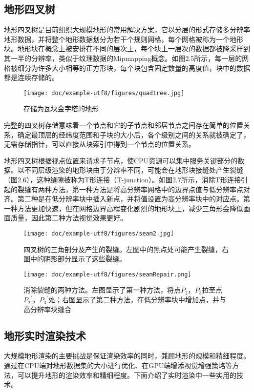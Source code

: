 \subsection{地形四叉树}
地形四叉树是目前组织大规模地形的常用解决方案，它以分层的形式存储多分辨率地形数据，并将整个地形数据划分为若干个规则网格，每个网格被称为一个地形块。地形块在概念上被安排在不同的层次上，每个块上一层次的数据都被降采样到其一半的分辨率，类似于纹理数据的Mipmapping概念。如图2.5所示，每一层的网格被细分为许多大小相等的正方形块，每个块包含固定数量的高度值，块中的数据都是连续存储的。\par
\begin{figure}[H]
    \centering
    \texttt{[image: doc/example-utf8/figures/quadtree.jpg]}
    \caption{存储为瓦块金字塔的地形\supercite{PlatingsCompression}}
\end{figure}
完整的四叉树存储意味着一个节点和它的子节点和邻居节点之间存在简单的位置关系，确定最顶层的经纬度范围和子块的大小后，各个级别之间的关系就被确定了，无需存储指针，可以直接从块索引中得到一个节点的位置关系。\par

地形四叉树根据视点位置来请求子节点，使CPU资源可以集中服务关键部分的数据。以不同层级渲染的地形块由于分辨率不同，可能会在地形块接缝处产生裂缝（图2.6），这种缝隙被称为T形连接（T-junction）。如图2.7所示，消除T形连接引起的裂缝有两种方法，第一种方法是将高分辨率网格中的边界点值与低分辨率点对齐。第二种是在低分辨率块中插入新点，并将值设置为高分辨率块中的对应点。第一种方法更加快速，但在网格边界高程变化剧烈的地形块上，减少三角形会降低画面质量，因此第二种方法视觉效果更好。
\begin{figure}[H]
    \centering
    \texttt{[image: doc/example-utf8/figures/seam2.jpg]}
    \caption{四叉树的三角剖分及产生的裂缝。左图中的黑点处可能产生裂缝，右图中的阴影部分显示了这些裂缝。\supercite{You2003Real}}
\end{figure}
\begin{figure}[H]
    \centering
    \texttt{[image: doc/example-utf8/figures/seamRepair.png]}
    \caption{消除裂缝的两种方法。左图显示了第一种方法，将点$P_2$，$P_3$拉至点${P_2}^{'}$，${P_3}^{'}$处；右图显示了第二种方法，在低分辨率块中增加点，并与高分辨率块缝合\supercite{You2003Real}}
\end{figure}
\subsection{地形实时渲染技术}
大规模地形渲染的主要挑战是保证渲染效率的同时，兼顾地形的规模和精细程度。通过在CPU端对地形数据集的大小进行优化、在GPU端增添视觉增强策略等方法，可以提升地形的渲染效率和精细程度。下面介绍了实时渲染中一些实用的技术。
